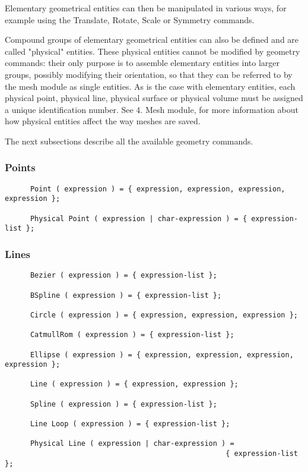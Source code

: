 Elementary geometrical entities can then be manipulated in various ways, for example using the Translate, Rotate, Scale or Symmetry commands.

Compound groups of elementary geometrical entities can also be defined and are called "physical" entities. These physical entities cannot be modified by geometry commands: their only purpose is to assemble elementary entities into larger groups, possibly modifying their orientation, so that they can be referred to by the mesh module as single entities. As is the case with elementary entities, each physical point, physical line, physical surface or physical volume must be assigned a unique identification number. See 4. Mesh module, for more information about how physical entities affect the way meshes are saved.

 

The next subsections describe all the available geometry commands. 
 
\subsubsection{Points}


\begin{verbatim}
      Point ( expression ) = { expression, expression, expression, expression };

      Physical Point ( expression | char-expression ) = { expression-list };
\end{verbatim}
 
\subsubsection{Lines}

\begin{verbatim}
      Bezier ( expression ) = { expression-list };

      BSpline ( expression ) = { expression-list };
 
      Circle ( expression ) = { expression, expression, expression };

      CatmullRom ( expression ) = { expression-list }; 

      Ellipse ( expression ) = { expression, expression, expression, expression };

      Line ( expression ) = { expression, expression };

      Spline ( expression ) = { expression-list };

      Line Loop ( expression ) = { expression-list };

      Physical Line ( expression | char-expression ) = 
                                                    { expression-list };
\end{verbatim}

